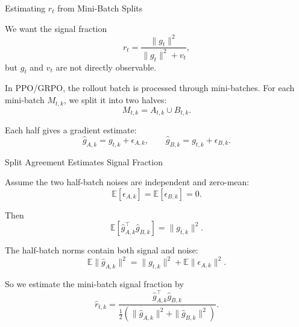 \documentclass[aspectratio=169]{beamer}
\begin{document}
\begin{frame}{Estimating \(r_t\) from Mini-Batch Splits}
\small

We want the signal fraction
\[
  r_t
  =
  \frac{\|g_t\|^2}{\|g_t\|^2+v_t},
\]
but \(g_t\) and \(v_t\) are not directly observable.

\vspace{0.8em}

In PPO/GRPO, the rollout batch is processed through mini-batches.
For each mini-batch \(M_{t,k}\), we split it into two halves:
\[
  M_{t,k}
  =
  A_{t,k}
  \cup
  B_{t,k}.
\]

\vspace{0.7em}

Each half gives a gradient estimate:
\[
  \hat g_{A,k}
  =
  g_{t,k}+\epsilon_{A,k},
  \qquad
  \hat g_{B,k}
  =
  g_{t,k}+\epsilon_{B,k}.
\]



\end{frame}


\begin{frame}{Split Agreement Estimates Signal Fraction}
\small

Assume the two half-batch noises are independent and zero-mean:
\[
  \mathbb{E}[\epsilon_{A,k}]
  =
  \mathbb{E}[\epsilon_{B,k}]
  =
  0.
\]

Then
\[
  \mathbb{E}
  \left[
    \hat g_{A,k}^{\top}\hat g_{B,k}
  \right]
  =
  \|g_{t,k}\|^2 .
\]

\vspace{0.7em}

The half-batch norms contain both signal and noise:
\[
  \mathbb{E}\|\hat g_{A,k}\|^2
  =
  \|g_{t,k}\|^2
  +
  \mathbb{E}\|\epsilon_{A,k}\|^2 .
\]

\vspace{0.8em}

So we estimate the mini-batch signal fraction by
\[
  \hat r_{t,k}
  =
  \frac{
    \hat g_{A,k}^{\top}\hat g_{B,k}
  }{
    \frac{1}{2}
    \left(
      \|\hat g_{A,k}\|^2
      +
      \|\hat g_{B,k}\|^2
    \right)
  }.
\]

\end{frame}
\end{document}
